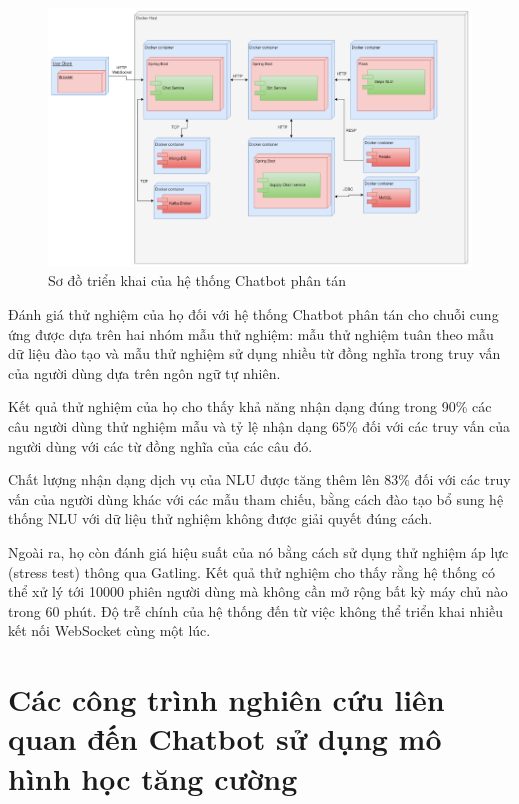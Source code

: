 \begin{center}
    \begin{figure}[ht!]
        \begin{center}
         \includegraphics[scale=0.97]{chapter2/img/commerce_diagram.png}
        \end{center}
        \caption{Sơ đồ triển khai của hệ thống Chatbot phân tán}
        \label{fig:commercediagram}
    \end{figure}
\end{center}

Đánh giá thử nghiệm của họ đối với hệ thống Chatbot phân tán cho chuỗi cung ứng được dựa trên hai nhóm mẫu thử nghiệm: mẫu thử nghiệm tuân theo mẫu dữ liệu đào tạo và mẫu thử nghiệm sử dụng nhiều từ đồng nghĩa trong truy vấn của người dùng dựa trên ngôn ngữ tự nhiên.

Kết quả thử nghiệm của họ cho thấy khả năng nhận dạng đúng trong 90\% các câu người dùng thử nghiệm mẫu và tỷ lệ nhận dạng 65\% đối với các truy vấn của người dùng với các từ đồng nghĩa của các câu đó.

Chất lượng nhận dạng dịch vụ của NLU được tăng thêm lên 83\% đối với các truy vấn của người dùng khác với các mẫu tham chiếu, bằng cách đào tạo bổ sung hệ thống NLU với dữ liệu thử nghiệm không được giải quyết đúng cách.

Ngoài ra, họ còn đánh giá hiệu suất của nó bằng cách sử dụng thử nghiệm áp lực (stress test) thông qua Gatling. Kết quả thử nghiệm cho thấy rằng hệ thống có thể xử lý tới 10000 phiên người dùng mà không cần mở rộng bất kỳ máy chủ nào trong 60 phút. Độ trễ chính của hệ thống đến từ việc không thể triển khai nhiều kết nối WebSocket cùng một lúc.

\section{Các công trình nghiên cứu liên quan đến Chatbot sử dụng mô hình học tăng cường}
